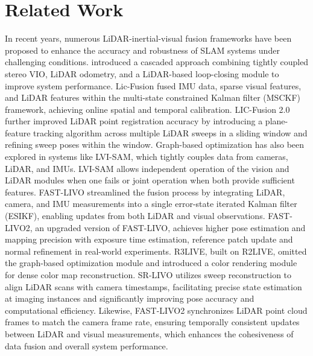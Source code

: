 \section{Related Work}
In recent years, numerous LiDAR-inertial-visual fusion frameworks have been proposed to enhance the accuracy and robustness of SLAM systems under challenging conditions. \cite{stereoLiDAR} introduced a cascaded approach combining tightly coupled stereo VIO, LiDAR odometry, and a LiDAR-based loop-closing module to improve system performance. Lic-Fusion fused IMU data, sparse visual features, and LiDAR features within the multi-state constrained Kalman filter (MSCKF) framework, achieving online spatial and temporal calibration. LIC-Fusion 2.0\cite{licfusion2} further improved LiDAR point registration accuracy by introducing a plane-feature tracking algorithm across multiple LiDAR sweeps in a sliding window and refining sweep poses within the window. Graph-based optimization has also been explored in systems like LVI-SAM\cite{lvisam}, which tightly couples data from cameras, LiDAR, and IMUs. LVI-SAM allows independent operation of the vision and LiDAR modules when one fails or joint operation when both provide sufficient features. FAST-LIVO\cite{fastlivo} streamlined the fusion process by integrating LiDAR, camera, and IMU measurements into a single error-state iterated Kalman filter (ESIKF), enabling updates from both LiDAR and visual observations. FAST-LIVO2\cite{fastlivo2}, an upgraded version of FAST-LIVO, achieves higher pose estimation and mapping precision with exposure time estimation, reference patch update and normal refinement in real-world experiments. R3LIVE\cite{R3live}, built on R2LIVE\cite{R2live}, omitted the graph-based optimization module and introduced a color rendering module for dense color map reconstruction. SR-LIVO \cite{srlivo} utilizes sweep reconstruction to align LiDAR scans with camera timestamps, facilitating precise state estimation at imaging instances and significantly improving pose accuracy and computational efficiency. Likewise, FAST-LIVO2 synchronizes LiDAR point cloud frames to match the camera frame rate, ensuring temporally consistent updates between LiDAR and visual measurements, which enhances the cohesiveness of data fusion and overall system performance. 

